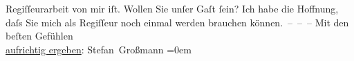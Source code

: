 \begin{ledgroupsized}[t]{13cm}
               Regiſſeurarbeit von mir iſt. Wollen Sie unſer Gaſt ſein?\pend
           \pstart
           Ich habe die Hoffnung, daſs Sie mich als Regiſſeur noch einmal werden brauchen
               können. – – –\pend
           \pstart
           Mit den beſten Gefühlen{\\[\baselineskip]}\uline{aufrichtig ergeben}:
                  \spacefill\mbox{Stefan Großmann}\pend
           \leftskip=0em{}\endnumbering{}\end{ledgroupsized}  \newcommand{\dateiname}{L01920}\newcommand{\titel}{Stefan Großmann an Arthur Schnitzler, 31. 3. 1910}\newcommand{\editorInnen}{ Martin Anton Müller und Gerd-Hermann Susen}
      